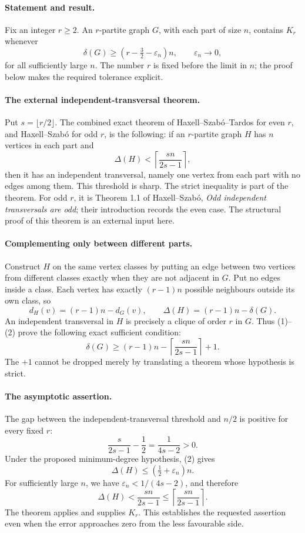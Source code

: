 \paragraph{Statement and result.}
Fix an integer \(r\geq2\). An \(r\)-partite graph \(G\), with each part of size \(n\), contains \(K_r\) whenever
\[
 \delta(G)\geq(r-\tfrac32-\varepsilon_n)n,\qquad
 \varepsilon_n\longrightarrow0,
\]
for all sufficiently large \(n\). The number \(r\) is fixed before the limit in \(n\); the proof below makes the required tolerance explicit.

\paragraph{The external independent-transversal theorem.}
Put \(s=\lfloor r/2\rfloor\). The combined exact theorem of Haxell--Szab\'o--Tardos for even \(r\), and Haxell--Szab\'o for odd \(r\), is the following: if an \(r\)-partite graph \(H\) has \(n\) vertices in each part and
\[
 \Delta(H)<\left\lceil\frac{s n}{2s-1}\right\rceil,
 \tag{1}
\]
then it has an independent transversal, namely one vertex from each part with no edges among them. This threshold is sharp. The strict inequality is part of the theorem. For odd \(r\), it is Theorem 1.1 of Haxell--Szab\'o, \emph{Odd independent transversals are odd}; their introduction records the even case. The structural proof of this theorem is an external input here.

\paragraph{Complementing only between different parts.}
Construct \(H\) on the same vertex classes by putting an edge between two vertices from different classes exactly when they are not adjacent in \(G\). Put no edges inside a class. Each vertex has exactly \((r-1)n\) possible neighbours outside its own class, so
\[
 d_H(v)=(r-1)n-d_G(v),\qquad
 \Delta(H)=(r-1)n-\delta(G).
 \tag{2}
\]
An independent transversal in \(H\) is precisely a clique of order \(r\) in \(G\). Thus (1)--(2) prove the following exact sufficient condition:
\[
 \delta(G)\geq
 (r-1)n-\left\lceil\frac{s n}{2s-1}\right\rceil+1.
 \tag{3}
\]
The \(+1\) cannot be dropped merely by translating a theorem whose hypothesis is strict.

\paragraph{The asymptotic assertion.}
The gap between the independent-transversal threshold and \(n/2\) is positive for every fixed \(r\):
\[
 \frac{s}{2s-1}-\frac12=\frac1{4s-2}>0.
\]
Under the proposed minimum-degree hypothesis, (2) gives
\[
 \Delta(H)\leq(\tfrac12+\varepsilon_n)n.
\]
For sufficiently large \(n\), we have
\(\varepsilon_n<1/(4s-2)\), and therefore
\[
 \Delta(H)<\frac{s n}{2s-1}
 \leq\left\lceil\frac{s n}{2s-1}\right\rceil.
\]
The theorem applies and supplies \(K_r\). This establishes the requested assertion even when the error approaches zero from the less favourable side.

